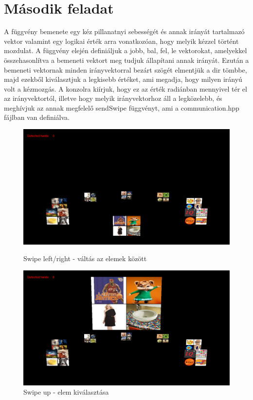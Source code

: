 \section{Második feladat}
A függvény bemenete egy kéz pillanatnyi sebességét és annak irányát tartalmazó vektor valamint egy logikai érték arra vonatkozóan, hogy melyik kézzel történt  mozdulat. A függvény elején definiáljuk a jobb, bal, fel, le vektorokat, amelyekkel összehasonlítva a bemeneti vektort meg tudjuk állapítani annak irányát. Ezután a bemeneti vektornak minden irányvektorral bezárt szögét elmentjük a dir tömbbe, majd ezekből kiválasztjuk a legkisebb értéket, ami megadja, hogy milyen irányú volt a kézmozgás. A konzolra kiírjuk, hogy ez az érték radiánban mennyivel tér el az irányvektortól, illetve hogy melyik irányvektorhoz áll a legközelebb, és meghívjuk az annak megfelelő sendSwipe függvényt, ami a communication.hpp fájlban van definiálva.



\begin{figure}[!ht]
	\includegraphics[width=150mm,keepaspectratio]{figures/m10/1.png}
	\label{fig:Road-of-a-char}
	\caption{Swipe left/right - váltás az elemek között}
\end{figure}
\begin{figure}[!ht]
	\includegraphics[width=150mm,keepaspectratio]{figures/m10/2.png}
	\caption{Swipe up - elem kiválasztása}
\end{figure}



